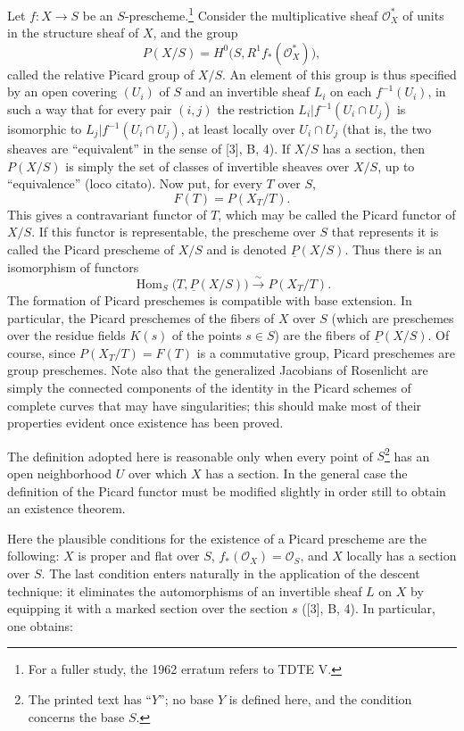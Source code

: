 Let $f:X\longrightarrow S$ be an $S$-prescheme.\footnote{For a fuller study,
the 1962 erratum refers to TDTE V.} Consider the multiplicative
sheaf $\mathcal O_X^*$ of units in the structure sheaf of $X$, and the group
\[
  P(X/S)=H^0\bigl(S,R^1f_*(\mathcal O_X^*)\bigr),
\]
called the relative Picard group of $X/S$. An element of this group is thus
specified by an open covering $(U_i)$ of $S$ and an invertible sheaf $L_i$ on
each $f^{-1}(U_i)$, in such a way that for every pair $(i,j)$ the restriction
$L_i|f^{-1}(U_i\cap U_j)$ is isomorphic to
$L_j|f^{-1}(U_i\cap U_j)$, at least locally over $U_i\cap U_j$ (that is, the
two sheaves are “equivalent” in the sense of [3], B, 4). If $X/S$ has a
section, then $P(X/S)$ is simply the set of classes of invertible sheaves over
$X/S$, up to “equivalence” (loco citato). Now put, for every $T$ over $S$,
\[
  F(T)=P(X_T/T).
\]
This gives a contravariant functor of $T$, which may be called the Picard functor of
$X/S$. If this functor is representable, the prescheme over $S$ that represents
it is called the Picard prescheme of $X/S$ and is denoted $\underline P(X/S)$.
Thus there is an isomorphism of functors
\[
  \operatorname{Hom}_S\bigl(T,\underline P(X/S)\bigr)
  \xrightarrow{\sim}P(X_T/T).
\]
The formation of Picard preschemes is compatible with base extension. In
particular, the Picard preschemes of the fibers of $X$ over $S$ (which are
preschemes over the residue fields $K(s)$ of the points $s\in S$) are the
fibers of $\underline P(X/S)$. Of course, since $P(X_T/T)=F(T)$ is a
commutative group, Picard preschemes are group preschemes. Note also that the
generalized Jacobians of Rosenlicht are simply the connected components of the
identity in the Picard schemes of complete curves that may have singularities;
this should make most of their properties evident once existence has been
proved.

 The definition adopted here is reasonable only when every
point of $S$\footnote{The printed text has “$Y$”; no base $Y$ is defined here,
and the condition concerns the base $S$.} has an open neighborhood $U$ over
which $X$ has a section. In the general case the definition of the Picard
functor must be modified slightly in order still to obtain an existence
theorem.

Here the plausible conditions for the existence of a Picard prescheme are the
following: $X$ is proper and flat over $S$, $f_*(\mathcal O_X)=\mathcal O_S$,
and $X$ locally has a section over $S$. The last condition enters naturally in
the application of the descent technique: it eliminates the automorphisms of
an invertible sheaf $L$ on $X$ by equipping it with a marked section over the
section $s$ ([3], B, 4). In particular, one obtains:


